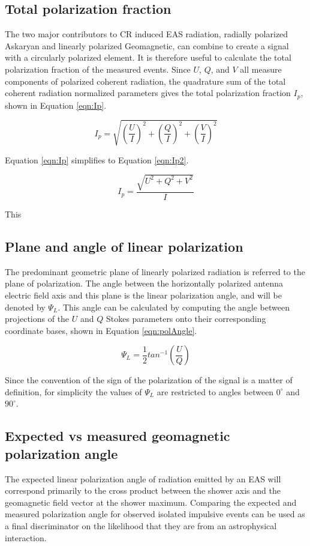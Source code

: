 	
	\subsection{Total polarization fraction}
		The two major contributors to CR induced EAS radiation, radially polarized Askaryan and linearly polarized Geomagnetic, can combine to create a signal with a circularly polarized element.  It is therefore useful to calculate the total polarization fraction of the measured events.  Since $U$, $Q$, and $V$ all measure components of polarized coherent radiation, the quadrature sum of the total coherent radiation normalized parameters gives the total polarization fraction $I_{p}$, shown in Equation \ref{eqn:Ip}.
		
	\begin{equation}
		I_p = \sqrt{(\frac{U}{I})^2 + (\frac{Q}{I})^2 + (\frac{V}{I})^2}
	\label{eqn:Ip}
	\end{equation}

		Equation \ref{eqn:Ip} simplifies to Equation \ref{eqn:Ip2}.
		
	\begin{equation}
		I_p = \frac{\sqrt{U^2 + Q^2 + V^2}}{I}
	\label{eqn:Ip2}
	\end{equation}

		This 
	\subsection{Plane and angle of linear polarization}
		The predominant geometric plane of linearly polarized radiation is referred to the plane of polarization.  The angle between the horizontally polarized antenna electric field axis and this plane is the linear polarization angle, and will be denoted by $\Psi_{L}$.  This angle can be calculated by computing the angle between projections of the $U$ and $Q$ Stokes parameters onto their corresponding coordinate bases, shown in Equation \ref{eqn:polAngle}.
	
	\begin{equation}
		\Psi_{L} = \frac{1}{2}tan^{-1}(\frac{U}{Q})
	\label{eqn:polAngle}
	\end{equation}
		
		Since the convention of the sign of the polarization of the signal is a matter of definition, for simplicity the values of $\Psi_{L}$ are restricted to angles between $0^\circ$ and $90^\circ$.
		
	\subsection{Expected vs measured geomagnetic polarization angle}
		The expected linear polarization angle of radiation emitted by an EAS will correspond primarily to the cross product between the shower axis and the geomagnetic field vector at the shower maximum.  Comparing the expected and measured polarization angle for observed isolated impulsive events can be used as a final discriminator on the likelihood that they are from an astrophysical interaction.  
		
